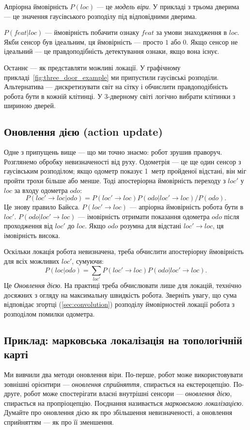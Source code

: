 Апріорна ймовірність $P(loc)$ — це \emph{модель віри}. У прикладі з трьома дверима — це значення гаусівського розподілу під відповідними дверима.

$P(feat|loc)$ — ймовірність побачити ознаку $feat$ за умови знаходження в $loc$. Якби сенсор був ідеальним, ця ймовірність — просто $1$ або $0$. Якщо сенсор не ідеальний — це правдоподібність детектування ознаки, якщо вона існує.

Останнє — як представляти можливі локації. У графічному прикладі~\cref{fig:three_door_example} ми припустили гаусівські розподіли. Альтернатива — дискретизувати світ на сітку і обчислити правдоподібність робота бути в кожній клітинці. У 3-дверному світі логічно вибрати клітинки з шириною дверей.

\subsection{Оновлення дією (action update)}
Одне з припущень вище — що ми точно знаємо: робот зрушив праворуч. Розглянемо обробку невизначеності від руху. Одометрія — це ще один сенсор з гаусівським розподілом; якщо одометр показує 1~метр пройденої відстані, він міг пройти трохи більше або менше. Тоді апостеріорна ймовірність переходу з $loc'$ у $loc$ за входу одометра $odo$:
\begin{equation}
P(loc'\to loc|odo) = P(loc'\to loc) P(odo|loc'\to loc) / P(odo).
\end{equation}
Це знову правило Байєса. $P(loc'\to loc)$ — апріорна ймовірність робота бути в $loc'$. $P(odo|loc'\to loc)$ — імовірність отримати показання одометра $odo$ після проходження від $loc'$ до $loc$. Якщо $odo$ розумна для відстані $loc' \to loc$, ця імовірність висока.

Оскільки локація робота невизначена, треба обчислити апостеріорну ймовірність для всіх можливих $loc'$, сумуючи:
\begin{equation}
P(loc|odo) = \sum_{loc'} P(loc'\to loc) P(odo|loc'\to loc).
\end{equation}
Це \emph{Оновлення дією}. На практиці треба обчислювати лише для локацій, технічно досяжних з огляду на максимальну швидкість робота. Зверніть увагу, що сума відповідає згортці (\cref{sec:convolution}) розподілу ймовірностей локації робота з розподілом помилки одометра.

\subsection{Приклад: марковська локалізація на топологічній карті}
Ми вивчили два методи оновлення віри. По-перше, робот може використовувати зовнішні орієнтири — \emph{оновлення сприйняття}, спирається на екстероцепцію. По-друге, робот може спостерігати власні внутрішні сенсори — \emph{оновлення дією}, спирається на пропріоцепцію. Поєднання називається \emph{марковською локалізацією}. Думайте про оновлення дією як про збільшення невизначеності, а оновлення сприйняттям — як про її зменшення.

